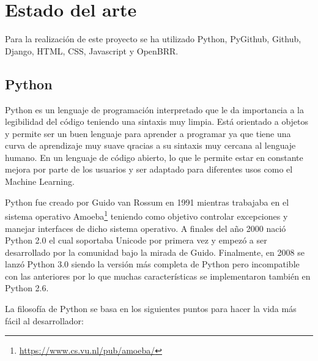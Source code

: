 \documentclass[a4paper, 12pt]{book}
\begin{document}

\cleardoublepage
\chapter{Estado del arte}
\label{chap:estado}

Para la realización de este proyecto se ha utilizado Python, PyGithub, Github, Django, HTML, CSS, Javascript y OpenBRR.

\section{Python}
\label{sec:python}

Python\cite{website:Python} es un lenguaje de programación interpretado que le da importancia a la legibilidad del código teniendo una sintaxis muy limpia. Está orientado a objetos y permite ser un buen lenguaje para aprender a programar ya que tiene una curva de aprendizaje muy suave qracias a su sintaxis muy cercana al lenguaje humano. En un lenguaje de código abierto, lo que le permite estar en constante mejora por parte de los usuarios y ser adaptado para diferentes usos como el Machine Learning.

Python fue creado por Guido van Rossum en 1991 mientras trabajaba en el sistema operativo Amoeba\footnote{\url{https://www.cs.vu.nl/pub/amoeba/}} teniendo como objetivo controlar excepciones y manejar interfaces de dicho sistema operativo. A finales del año 2000 nació Python 2.0 el cual soportaba Unicode por primera vez y empezó a ser desarrollado por la comunidad bajo la mirada de Guido. Finalmente, en 2008 se lanzó Python 3.0 siendo la versión más completa de Python pero incompatible con las anteriores por lo que muchas características se implementaron también en Python 2.6.

La filosofía de Python se basa en los siguientes puntos para hacer la vida más fácil al desarrollador:
\end{document}
